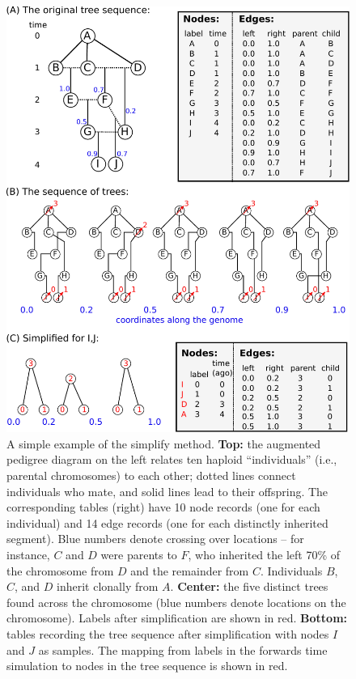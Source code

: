 \documentclass{article}
\begin{document}
\begin{figure}
    \begin{center}
        \includegraphics{method_diagram}
    \end{center}
    \caption{
        A simple example of the simplify method.
        \textbf{Top:} the augmented pedigree diagram on the left 
        relates ten haploid ``individuals'' (i.e., parental chromosomes) to each other;
        dotted lines connect individuals who mate, and solid lines lead to their offspring.
        The corresponding tables (right) have 10 node records (one for each individual)
        and 14 edge records (one for each distinctly inherited segment).
        Blue numbers denote crossing over locations --
        for instance, $C$ and $D$ were parents to $F$,
        who inherited the left 70\% of the chromosome from $D$ and the remainder from $C$.
        Individuals $B$, $C$, and $D$ inherit clonally from $A$.
        \textbf{Center:} the five distinct trees
        found across the chromosome (blue numbers denote locations on the chromosome).
        Labels after simplification are shown in red.
        \textbf{Bottom:} tables recording the tree sequence after simplification
        with nodes $I$ and $J$ as samples.
        The mapping from labels in the forwards time simulation to nodes in the tree sequence
        is shown in red.
        \label{fig:method_diagram}
    }
\end{figure}
\end{document}
